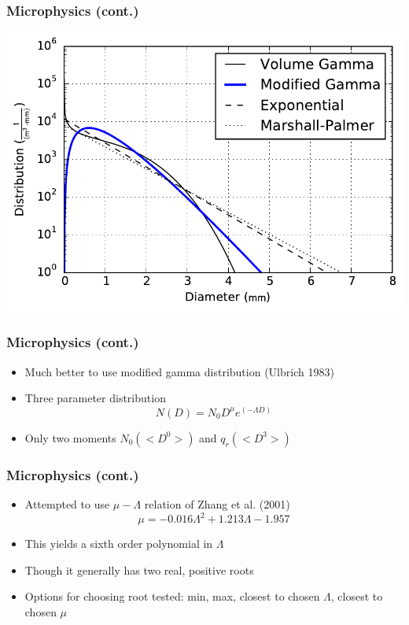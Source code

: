 \documentclass[red]{beamer}
\begin{document}
\begin{frame}
	\frametitle{Microphysics (cont.)}
	\begin{center}
		\includegraphics[scale=0.6]{figures/distribution-comparison.pdf}
	\end{center}
\end{frame}

\begin{frame}[<+->]
	\frametitle{Microphysics (cont.)}
	\begin{itemize}
		\item Much better to use modified gamma distribution (Ulbrich 1983)
		\item Three parameter distribution
		\begin{equation}
			N(D) = N_0 D^\mu e^{(-\Lambda D)}
		\end{equation}
		\item Only two moments $N_0 (<D^0>)$ and $q_r (<D^3>)$
	\end{itemize}
\end{frame}

\begin{frame}[<+->]
	\frametitle{Microphysics (cont.)}
	\begin{itemize}
		\item Attempted to use $\mu-\Lambda$ relation of Zhang et al. (2001)
		\begin{equation}
			\mu = \num{-0.016} \Lambda^2 + \num{1.213} \Lambda - \num{1.957}
		\end{equation}
		\item This yields a sixth order polynomial in $\Lambda$
		\item Though it generally has two real, positive roots
		\item Options for choosing root tested: min, max, closest to chosen $\Lambda$, closest to chosen $\mu$
	\end{itemize}
\end{frame}
\end{document}
